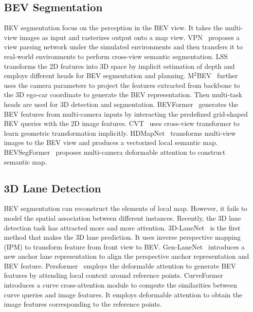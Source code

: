 \documentclass[10pt,twocolumn,letterpaper]{article}
\begin{document}
\subsection{BEV Segmentation}
BEV segmentation focus on the perception in the BEV view. It takes the multi-view images as input and rasterizes output onto a map view.
VPN~\cite{pan2020cross} proposes a view parsing network under the simulated environments and then transfers it to real-world environments to perform cross-view semantic segmentation.
LSS~\cite{philion2020lift} transforms the 2D features into 3D space by implicit estimation of depth and employs different heads for BEV segmentation and planning. 
M$^{2}$BEV~\cite{xie2022m} further uses the camera parameters to project the features extracted from backbone to the 3D ego-car coordinate to generate the BEV representation. Then multi-task heads are used for 3D detection and segmentation.
BEVFormer~\cite{li2022bevformer} generates the BEV features from multi-camera inputs by interacting the predefined grid-shaped BEV queries with the 2D image features.
CVT~\cite{zhou2022cross} uses cross-view transformer to learn geometric transformation implicitly.
HDMapNet~\cite{li2021hdmapnet} transforms multi-view images to the BEV view and produces a vectorized local semantic map.  
BEVSegFormer~\cite{peng2022bevsegformer} proposes multi-camera
deformable attention to construct semantic map. 

\subsection{3D Lane Detection}
BEV segmentation can reconstruct the elements of local map. However, it fails to model the spatial association between different instances. Recently, the 3D lane detection task has attracted more and more attention. 3D-LaneNet~\cite{garnett20193d} is the first method that makes the 3D lane prediction. It uses inverse perspective mapping (IPM) to transform feature from front view to BEV. Gen-LaneNet~\cite{guo2020gen} introduces a new anchor lane representation to align the perspective anchor representation and BEV feature. Persformer~\cite{chen2022persformer} employs the deformable attention to generate BEV features by attending local context around reference points.    
CurveFormer~\cite{bai2022curveformer} introduces a curve cross-attention module to compute the similarities between curve queries and image features. It employs deformable attention to obtain the image features corresponding to the reference points.
\end{document}
